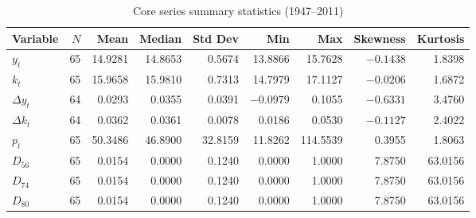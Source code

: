 \begin{longtable}[t]{lrrrrrrrr}
\caption{Core series summary statistics (1947--2011)}\label{tab:app_summary_stats}\\
\toprule
Variable & $N$ & Mean & Median & Std Dev & Min & Max & Skewness & Kurtosis \\
\midrule
$y_t$ & 65 & 14.9281 & 14.8653 & 0.5674 & 13.8866 & 15.7628 & $-0.1438$ & 1.8398 \\
$k_t$ & 65 & 15.9658 & 15.9810 & 0.7313 & 14.7979 & 17.1127 & $-0.0206$ & 1.6872 \\
$\Delta y_t$ & 64 & 0.0293 & 0.0355 & 0.0391 & $-0.0979$ & 0.1055 & $-0.6331$ & 3.4760 \\
$\Delta k_t$ & 64 & 0.0362 & 0.0361 & 0.0078 & 0.0186 & 0.0530 & $-0.1127$ & 2.4022 \\
$p_t$ & 65 & 50.3486 & 46.8900 & 32.8159 & 11.8262 & 114.5539 & 0.3955 & 1.8063 \\
\addlinespace
$D_{56}$ & 65 & 0.0154 & 0.0000 & 0.1240 & 0.0000 & 1.0000 & 7.8750 & 63.0156 \\
$D_{74}$ & 65 & 0.0154 & 0.0000 & 0.1240 & 0.0000 & 1.0000 & 7.8750 & 63.0156 \\
$D_{80}$ & 65 & 0.0154 & 0.0000 & 0.1240 & 0.0000 & 1.0000 & 7.8750 & 63.0156 \\
\bottomrule
\end{longtable}
